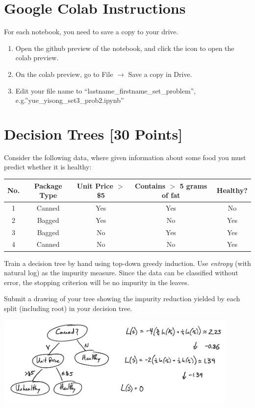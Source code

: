 \section*{Google Colab Instructions}
For each notebook, you need to save a copy to your drive.
\begin{enumerate}
	\item Open the github preview of the notebook, and click the icon to open the colab preview.
	\item On the colab preview, go to File $\rightarrow$ Save a copy in Drive.
	\item Edit your file name to “lastname_firstname_set_problem”, e.g.”yue_yisong_set3_prob2.ipynb”
\end{enumerate}


\newpage
\section{Decision Trees [30 Points]}

\problem[7]
Consider the following data, where given information about some food you must predict whether it is healthy:

\begin{table}[ht]
\centering
\begin{tabular}{c | c c c | c}
\hline
No. & Package Type & Unit Price $>$ \$5 & Contains $>$ 5 grams of fat & Healthy? \\ [0.5ex]
\hline
1 & Canned & Yes & Yes & No  \\
2 & Bagged & Yes & No  & Yes \\
3 & Bagged & No  & Yes & Yes \\
4 & Canned & No  & No  & Yes \\ [1ex]
\hline
\end{tabular}
\end{table}

Train a decision tree by hand using top-down greedy induction. Use \emph{entropy} (with natural log) as the impurity measure.  Since the data can be classified
without error, the stopping criterion will be no impurity in the leaves.

Submit a drawing of your tree showing the impurity reduction yielded by each split (including root) in your decision tree.

\begin{solution}

    \includegraphics[width=0.9\textwidth]{images/1a.png}

\end{solution}

